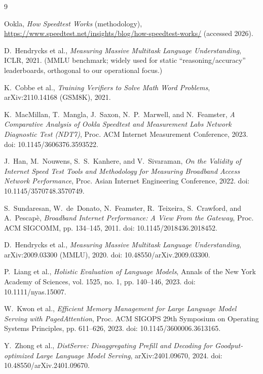 \documentclass[11pt, a4paper]{article}
\begin{document}
\begin{thebibliography}{9}

 Ookla, \emph{How Speedtest Works} (methodology), \url{https://www.speedtest.net/insights/blog/how-speedtest-works/} (accessed 2026).

 D.~Hendrycks et al., \emph{Measuring Massive Multitask Language Understanding}, ICLR, 2021. (MMLU benchmark; widely used for static ``reasoning/accuracy'' leaderboards, orthogonal to our operational focus.)

 K.~Cobbe et al., \emph{Training Verifiers to Solve Math Word Problems}, arXiv:2110.14168 (GSM8K), 2021.

K.~MacMillan, T.~Mangla, J.~Saxon, N.~P.~Marwell, and N.~Feamster, 
\emph{A Comparative Analysis of Ookla Speedtest and Measurement Labs Network Diagnostic Test (NDT7)}, 
Proc. ACM Internet Measurement Conference, 2023. doi: 10.1145/3606376.3593522.

J.~Han, M.~Nouwens, S.~S.~Kanhere, and V.~Sivaraman, 
\emph{On the Validity of Internet Speed Test Tools and Methodology for Measuring Broadband Access Network Performance}, 
Proc. Asian Internet Engineering Conference, 2022. doi: 10.1145/3570748.3570749.

S.~Sundaresan, W.~de~Donato, N.~Feamster, R.~Teixeira, S.~Crawford, and A.~Pescap{\`e}, 
\emph{Broadband Internet Performance: A View From the Gateway}, 
Proc. ACM SIGCOMM, pp. 134--145, 2011. doi: 10.1145/2018436.2018452.

D.~Hendrycks et al., 
\emph{Measuring Massive Multitask Language Understanding}, 
arXiv:2009.03300 (MMLU), 2020. doi: 10.48550/arXiv.2009.03300.

P.~Liang et al., 
\emph{Holistic Evaluation of Language Models}, 
Annals of the New York Academy of Sciences, vol. 1525, no. 1, pp. 140--146, 2023. doi: 10.1111/nyas.15007.

W.~Kwon et al., 
\emph{Efficient Memory Management for Large Language Model Serving with PagedAttention}, 
Proc. ACM SIGOPS 29th Symposium on Operating Systems Principles, pp. 611--626, 2023. doi: 10.1145/3600006.3613165.

Y.~Zhong et al., 
\emph{DistServe: Disaggregating Prefill and Decoding for Goodput-optimized Large Language Model Serving}, 
arXiv:2401.09670, 2024. doi: 10.48550/arXiv.2401.09670.


\end{thebibliography}
\end{document}

